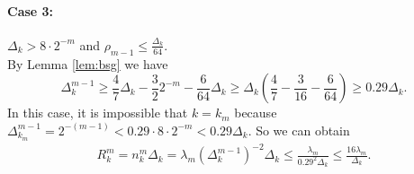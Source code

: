 \paragraph{Case 3:} $\Delta_k > 8 \cdot 2^{-m}$ and $\rho_{m-1} \leq \frac{\Delta_k}{64}$.\\
By Lemma \ref{lem:bsg} we have
\[\Delta_k^{m-1} \geq \frac{4}{7}\Delta_k - \frac{3}{2}2^{-m} - \frac{6}{64}\Delta_k \geq \Delta_k\left(\frac{4}{7} - \frac{3}{16} - \frac{6}{64}\right) \geq 0.29 \Delta_k.\]
In this case, it is impossible that $k=k_m$ because $\Delta_{k_m}^{m-1} = 2^{-(m-1)}<0.29\cdot 8\cdot 2^{-m}<0.29\Delta_k$.
So we can obtain
\begin{align*}
   R_k^m= n_k^m \Delta_k = \lambda_m(\Delta_k^{m-1})^{-2} \Delta_k
    \leq \frac{\lambda_m}{0.29^2 \Delta_k} 
    \leq \frac{16\lambda_m}{\Delta_k}.
\end{align*}

